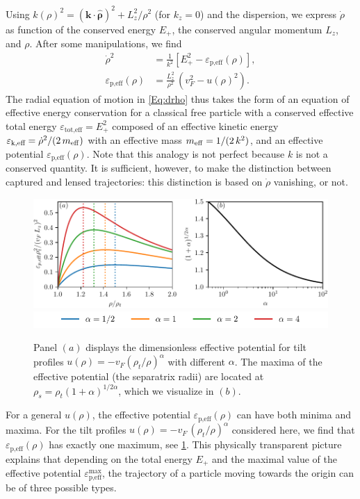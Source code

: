 \documentclass[submission, Phys]{SciPost}
\begin{document}
Using $k(\rho)^2= (\bm k \cdot \hat{\bm \rho})^2+L_z^2/\rho^2$ (for $k_z=0$) and the dispersion, we express $\dot{\rho}$ as function of the conserved energy $E_+$, the conserved angular momentum $L_z$, and $\rho$. After some manipulations, we find
\begin{align}
    \dot{\rho}^2&=\frac{1}{k^2}\left[ E_+^2-{\varepsilon}_{\text{p,eff}}(\rho)\right],
    \label{Eq:drho} \\
    {\varepsilon}_{\text{p,eff}}(\rho) &= \frac{ L_z^2}{\rho^2}\,\left(v_F^2-u(\rho)^2\right).
    \label{Eq:drhoveff}
\end{align}
The radial equation of motion in \cref{Eq:drho} thus takes the form of an equation of effective energy conservation for a classical free particle with a conserved effective total energy $\varepsilon_{\text{tot,eff}}=E_+^2$ composed of an effective kinetic energy $\varepsilon_{\text{k,eff}}=\dot{\rho}^2/(2\,m_{\rm eff})$ with an effective mass $m_{\rm eff}=1/(2\,k^2)$, and an effective potential ${\varepsilon}_{\text{p,eff}}(\rho)$. Note that this analogy is not perfect because $k$ is not a conserved quantity. It is sufficient, however, to make the distinction between captured and lensed trajectories: this distinction is based on $\dot{\rho}$ vanishing, or not.

\begin{figure}[ht]
\centering
    \includegraphics{fig/effective_potential.pdf}
    \includegraphics{fig/effective_potential_legend.pdf}
    \caption{Panel $(a)$ displays the dimensionless effective potential for tilt profiles $u(\rho)=-v_F(\rho_t/\rho)^\alpha$ with different $\alpha$. The maxima of the effective potential (the separatrix radii) are located at $\rho_s=\rho_t(1+\alpha)^{1/2\alpha}$, which we visualize in $(b)$.}
    \label{fig:EffPot}
\end{figure}

For a general $u(\rho)$, the effective potential ${\varepsilon}_{\text{p,eff}}(\rho)$ can have both minima and maxima. For the tilt profiles $u(\rho)=-v_F\,(\rho_t/\rho)^\alpha$ considered here, we find that ${\varepsilon}_{\text{p,eff}}(\rho)$ has exactly one maximum, see \cref{fig:EffPot}. This physically transparent picture explains that depending on the total energy $E_+$ and the maximal value of the effective potential ${\varepsilon}_{\text{p,eff}}^{\text{max}}$, the trajectory of a particle moving {towards} the origin can be of three possible types.
\end{document}
